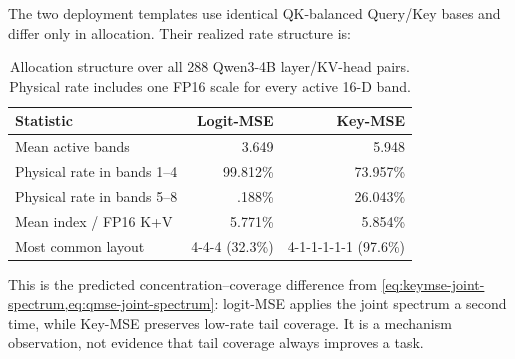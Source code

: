 The two deployment templates use identical QK-balanced Query/Key bases and
differ only in allocation.  Their realized rate structure is:

\begin{table}[H]
\caption{Allocation structure over all 288 Qwen3-4B layer/KV-head pairs.
Physical rate includes one FP16 scale for every active 16-D band.}
\label{tab:allocation-structure}
\centering
\begin{tabular}{lrr}
\toprule
Statistic & Logit-MSE & Key-MSE \\
\midrule
Mean active bands & 3.649 & 5.948 \\
Physical rate in bands 1--4 & 99.812\% & 73.957\% \\
Physical rate in bands 5--8 & .188\% & 26.043\% \\
Mean index / FP16 K+V & 5.771\% & 5.854\% \\
Most common layout & 4-4-4 (32.3\%) & 4-1-1-1-1-1 (97.6\%) \\
\bottomrule
\end{tabular}
\end{table}

This is the predicted concentration--coverage difference from
\cref{eq:keymse-joint-spectrum,eq:qmse-joint-spectrum}: logit-MSE applies
the joint spectrum a second time, while Key-MSE preserves low-rate tail
coverage.  It is a mechanism observation, not evidence that tail coverage
always improves a task.

\begin{table}[H]
\caption{Cross-model sports/medicine traces at 1\% active tokens.
``Oracle mass recall'' weights exact top-$1\%$ tokens by their Full-attention
probability.}
\label{tab:rate-allocation}
\centering
{}
\end{table}

